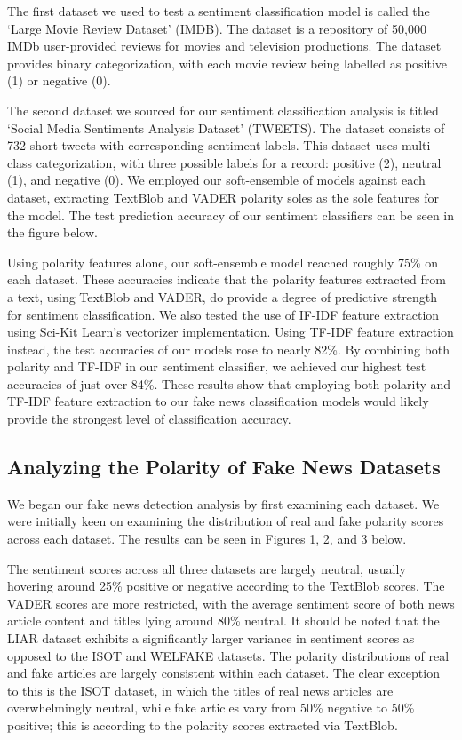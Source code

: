 \documentclass[twocolumn,10pt]{article}
\begin{document}
The first dataset we used to test a sentiment classification model is called the ‘Large Movie Review Dataset’ \cite{8} (IMDB). The dataset  is a repository of 50,000 IMDb user-provided reviews for movies and television productions. The dataset provides binary categorization, with each movie review being labelled as positive (1) or negative (0). 

The second dataset we sourced for our sentiment classification analysis is titled ‘Social Media Sentiments Analysis Dataset’ \cite{9} (TWEETS). The dataset consists of 732 short tweets with corresponding sentiment labels. This dataset uses multi-class categorization, with three possible labels for a record: positive (2), neutral (1), and negative (0). We employed our soft-ensemble of models against each dataset, extracting TextBlob and VADER polarity soles as the sole features for the model. The test prediction accuracy of our sentiment classifiers can be seen in the figure below.

Using polarity features alone, our soft-ensemble model reached roughly 75\% on each dataset. These accuracies indicate that the polarity features extracted from a text, using TextBlob and VADER, do provide a degree of predictive strength for sentiment classification. We also tested the use of IF-IDF feature extraction using Sci-Kit Learn’s \cite{10} vectorizer implementation. Using TF-IDF feature extraction instead, the test accuracies of our models rose to nearly 82\%. By combining both polarity and TF-IDF in our sentiment classifier, we achieved our highest test accuracies of just over 84\%. These results show that employing both polarity and TF-IDF feature extraction to our fake news classification models would likely provide the strongest level of classification accuracy.

\subsection{Analyzing the Polarity of  Fake News Datasets}
We began our fake news detection analysis by first examining each dataset. We were initially keen on examining the distribution of real and fake polarity scores across each dataset. The results can be seen in Figures 1, 2, and 3 below.

The sentiment scores across all three datasets are largely neutral, usually hovering around 25\% positive or negative according to the TextBlob scores. The VADER scores are more restricted, with the average sentiment score of both news article content and titles lying around 80\% neutral. It should be noted that the LIAR dataset exhibits a significantly larger variance in sentiment scores as opposed to the ISOT and WELFAKE datasets. The polarity distributions of real and fake articles are largely consistent within each dataset. The clear exception to this is the ISOT dataset, in which the titles of real news articles are overwhelmingly neutral, while fake articles vary from 50\% negative to 50\% positive; this is according to the polarity scores extracted via TextBlob.
\end{document}
